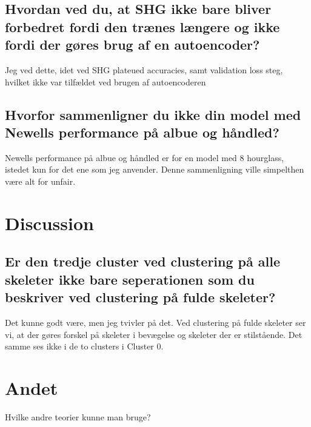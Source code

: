 \documentclass[a4paper]{article}
\begin{document}
\subsection{Hvordan ved du, at SHG ikke bare bliver forbedret fordi den trænes længere og ikke fordi der gøres brug af en autoencoder?}
Jeg ved dette, idet ved SHG plateued accuracies, samt validation loss steg, hvilket ikke var tilfældet ved brugen af autoencoderen

\subsection{Hvorfor sammenligner du ikke din model med Newells performance på albue og håndled?}
Newells performance på albue og håndled er for en model med $8$ hourglass, istedet kun for det ene som jeg anvender. Denne sammenligning ville simpelthen være alt for unfair.

\section{Discussion}
\subsection*{Er den tredje cluster ved clustering på alle skeleter ikke bare seperationen som du beskriver ved clustering på fulde skeleter?}
Det kunne godt være, men jeg tvivler på det. Ved clustering på fulde skeleter ser vi, at der gøres forskel på skeleter i bevægelse og skeleter der er stilstående. Det samme ses ikke i de to clusters i Cluster 0.

\section{Andet}
Hvilke andre teorier kunne man bruge?
\end{document}
